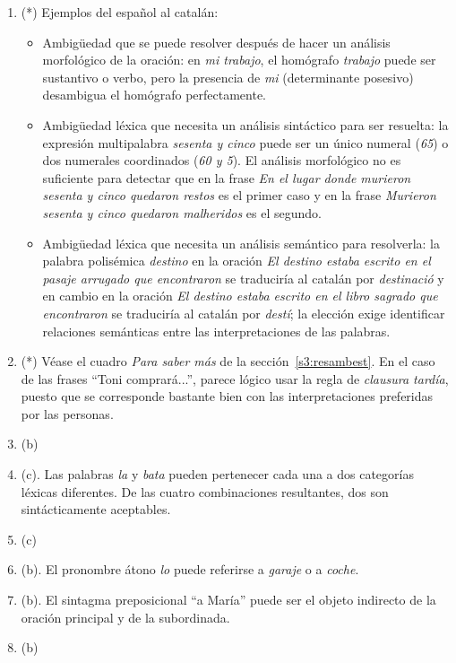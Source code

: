 \begin{enumerate}
\item (*) Ejemplos del español al catalán: \begin{itemize} \item Ambigüedad que se puede resolver después de hacer un análisis morfológico de la oración: en \emph{mi trabajo}, el homógrafo \emph{trabajo} puede ser sustantivo o verbo, pero la presencia de \emph{mi} (determinante posesivo) desambigua el homógrafo perfectamente. \item Ambigüedad léxica que necesita un análisis sintáctico para ser resuelta: la expresión multipalabra \emph{sesenta y cinco} puede ser un único numeral (\emph{65}) o dos numerales coordinados (\emph{60 y 5}). El análisis morfológico no es suficiente para detectar que en la frase \emph{En el lugar donde murieron sesenta y cinco quedaron restos} es el primer caso y en la frase \emph{Murieron sesenta y cinco quedaron malheridos} es el segundo. \item Ambigüedad léxica que necesita un análisis semántico para resolverla: la palabra polisémica \emph{destino} en la oración \emph{El destino estaba escrito en el pasaje arrugado que encontraron} se traduciría al catalán por \emph{destinació} y en cambio en la oración \emph{El destino estaba escrito en el libro sagrado que encontraron} se traduciría al catalán por \emph{destí}; la elección exige identificar relaciones semánticas entre las interpretaciones de las palabras. \end{itemize} 

\item (*) Véase el cuadro \emph{Para saber más} de la sección~\ref{s3:resambest}. En el caso de las frases ``Toni comprará...'', parece lógico usar la regla de {\em clausura tardía}, puesto que se corresponde bastante bien con las interpretaciones preferidas por las personas. 

\item (b) \item (c). Las palabras \emph{la} y \emph{bata} pueden pertenecer cada una a dos categorías léxicas diferentes. De las cuatro combinaciones resultantes, dos son sintácticamente aceptables. \item (c) \item (b). El pronombre átono \emph{lo} puede referirse a  \emph{garaje} o a \emph{coche}. \item (b). El sintagma preposicional ``a María'' puede ser el objeto indirecto de la oración principal y de la subordinada. \item (b) 


\end{enumerate}
